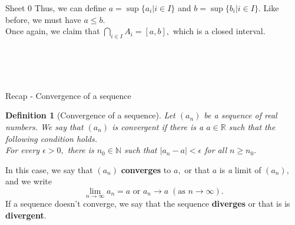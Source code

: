 \documentclass[pdf, aspectratio=169]{beamer}
\newtheorem{defn}{Definition}
\begin{document}
\begin{frame}{Sheet 0}
    Thus, we can define $a = \sup\{a_i | i \in I\}$ and $b = \sup\{b_i | i \in I\}.$
    Like before, we must have $a \le b.$\\
    Once again, we claim that $\displaystyle\bigcap_{i\in I}A_i = [a, b],$ which is a closed interval.

    \begin{enumerate}
        \setcounter{enumi}{10}
        \\
        \\
        \\
    \end{enumerate}
\end{frame}
\begin{frame}{Recap - Convergence of a sequence}
    \begin{defn}[Convergence of a sequence]
        Let $(a_n)$ be a sequence of real numbers. We say that $(a_n)$ is convergent if there is a $a \in \mathbb{R}$ such that the following condition holds.\\
        For every $\epsilon > 0,$ there is $n_0 \in \mathbb{N}$ such that $|a_n - a| < \epsilon$ for all $n \ge n_0.$
    \end{defn}
    In this case, we say that $(a_n)$ \textbf{converges} to $a,$ or that $a$ is \emph{a} limit of $(a_n),$ and we write 
    \[\lim_{n\to \infty} a_n = a \text{ or } a_n \longrightarrow a \;(\text{as }n \longrightarrow \infty).\]
    If a sequence doesn't converge, we say that the sequence \textbf{diverges} or that is is \textbf{divergent}.
\end{frame}
\end{document}
